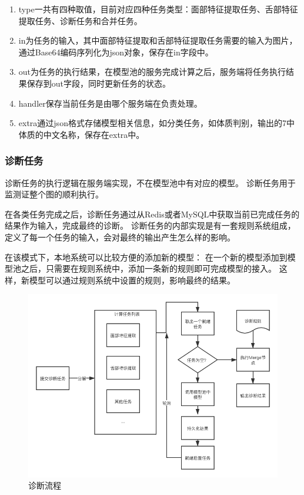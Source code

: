 \begin{enumerate}
    
    \item type一共有四种取值，目前对应四种任务类型：面部特征提取任务、舌部特征提取任务、诊断任务和合并任务。

    \item in为任务的输入，其中面部特征提取和舌部特征提取任务需要的输入为图片，通过Base64编码序列化为json对象，保存在in字段中。

    \item out为任务的执行结果，在模型池的服务完成计算之后，服务端将任务执行结果保存到out字段，同时更新任务的状态。

    \item  handler保存当前任务是由哪个服务端在负责处理。

    \item extra通过json格式存储模型相关信息，如分类任务，如体质判别，输出的7中体质的中文名称，保存在extra中。
\end{enumerate}

\subsubsection{诊断任务}


诊断任务的执行逻辑在服务端实现，不在模型池中有对应的模型。 诊断任务用于监测证整个图的顺利执行。

在各类任务完成之后，诊断任务通过从Redis或者MySQL中获取当前已完成任务的结果作为输入，完成最终的诊断。 
诊断任务的内部实现是有一套规则系统组成，定义了每一个任务的输入，会对最终的输出产生怎么样的影响。

在该模式下，本地系统可以比较方便的添加新的模型： 在一个新的模型添加到模型池之后，只需要在规则系统中，添加一条新的规则即可完成模型的接入。
这样，新模型可以通过规则系统中设置的规则，影响最终的结果。

\begin{figure}[ht]
    \centering
    \includegraphics[width=12cm]{images/sketch2.png}
    \caption{诊断流程}
    \label{fig:sketch}
\end{figure}

